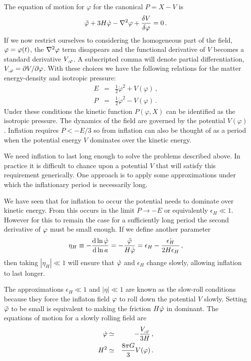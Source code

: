The equation of motion for $\varphi$ for the canonical $P=X-V$ is
% 
\begin{equation}
 \label{eq:phieom1-intro}
 \ddot{\varphi} + 3H\dot{\varphi} -\nabla^2 \varphi + \frac{\delta V}{\delta \varphi} = 0\,.
\end{equation}
% 
If we now restrict ourselves to considering the homogeneous part of the field,
$\varphi=\varphi(t)$, the $\nabla^2\varphi$ term disappears and the functional derivative
of $V$ becomes a standard derivative $V_{,\varphi}$. A subscripted comma will
denote partial differentiation, $V_{,\varphi}=\partial V/\partial\varphi$.
With these choices we have the following relations for the matter
energy-density and isotropic pressure:
% 
\begin{eqnarray}
\label{eq:EandP-intro}
 E &=& \frac{1}{2}\dot{\varphi}^2 + V(\varphi) \,,\\
 P &=& \frac{1}{2}\dot{\varphi}^2 - V(\varphi) \,.
\end{eqnarray}
% 
Under these conditions the kinetic function $P(\varphi, X)$ can be identified as
the isotropic pressure. The dynamics of the field are governed by the potential
$V(\varphi)$. Inflation requires $P<-E/3$ so from  inflation
can also be thought of as a period when the potential energy $V$ dominates over
the kinetic energy. 


We need inflation to last long enough to solve the problems described above. In
practice it is difficult to chance upon a potential $V$ that will satisfy this
requirement generically. One approach is to apply some approximations under
which the inflationary period is necessarily long. 

We have seen that for
inflation to occur the potential needs to dominate over kinetic energy. From
 this occurs in the limit $P\rightarrow -E$ or equivalently
$\epsilon_H \ll 1$. However for this to remain the case for a sufficiently long
period the second derivative of $\varphi$ must be small enough. If we define
another parameter 
% 
\begin{equation}
 \label{eq:etaHdefn-intro}
 \eta_H \equiv -\frac{\mathrm{d} \ln \dot{\varphi}}{\mathrm{d} \ln a} =
-\frac{\ddot{\varphi}}{H\dot{\varphi}}
 =\epsilon_H -\frac{\dot{\epsilon_H}}{2H\epsilon_H}\,,
\end{equation}
% 
then taking $|\eta_H|\ll 1$ will ensure that $\dot{\varphi}$ and $\epsilon_H$
change slowly, allowing inflation to last longer.

The approximations $\epsilon_H\ll 1$ and $|\eta|\ll 1$ are known as the
slow-roll conditions because they force the inflaton field $\varphi$ to roll down
the potential $V$ slowly. Setting $\ddot{\varphi}$ to be small is equivalent to
making the friction $H\dot{\varphi}$ in  dominant. The
equations of motion for a slowly rolling field are 
% 
\begin{eqnarray}
 \dot{\varphi} &\simeq& - \frac{V_{,\varphi}}{3H}\,, \\
 H^2 &\simeq& \frac{8\pi G}{3}V(\varphi)\,.
\end{eqnarray}




